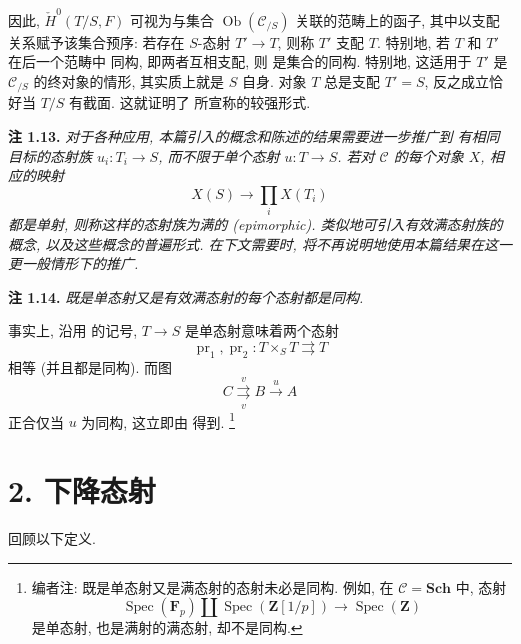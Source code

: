 因此, \(\check H^{0}(T/S,F)\) 可视为与集合
\(\operatorname{Ob}(\mathscr C_{/S})\) 关联的范畴上的函子,
其中以支配关系赋予该集合预序: 若存在 \(S\)-态射 \(T'\to T\),
则称 \(T'\) 支配 \(T\). 特别地, 若 \(T\) 和 \(T'\) 在后一个范畴中
同构, 即两者互相支配, 则
 是集合的同构.
特别地, 这适用于 \(T'\) 是 \(\mathscr C_{/S}\) 的终对象的情形,
其实质上就是 \(S\) 自身. 对象 \(T\) 总是支配 \(T'=S\),
反之成立恰好当 \(T/S\) 有截面. 这就证明了
 所宣称的较强形式.

\medskip
\noindent{}\textbf{注 1.13.}
\textit{对于各种应用, 本篇引入的概念和陈述的结果需要进一步推广到
有相同目标的态射族 \(u_i:T_i\to S\), 而不限于单个态射
\(u:T\to S\). 若对 \(\mathscr C\) 的每个对象 \(X\), 相应的映射}
\[
  X(S)\longrightarrow\prod_i X(T_i)
\]
\textit{都是单射, 则称这样的态射族为\emph{满的 (epimorphic)}.
类似地可引入有效满态射族的概念, 以及这些概念的普遍形式.
在下文需要时, 将不再说明地使用本篇结果在这一更一般情形下的推广.}

\medskip
\noindent{}\textbf{注 1.14.}
\textit{既是单态射又是有效满态射的每个态射都是同构.}

事实上, 沿用  的记号,
\(T\to S\) 是单态射意味着两个态射
\[
  \operatorname{pr}_1,\operatorname{pr}_2:T\times_ST
  \rightrightarrows T
\]
相等 (并且都是同构). 而图
\[
  C\overset{v}{\underset{v}{\rightrightarrows}}B\xrightarrow{u}A
\]
正合仅当 \(u\) 为同构, 这立即由
 得到.
\footnote{编者注: 既是单态射又是满态射的态射未必是同构.
例如, 在 \(\mathscr C=\mathbf{Sch}\) 中, 态射
\[
  \operatorname{Spec}(\mathbf F_p)\amalg
  \operatorname{Spec}(\mathbf Z[1/p])
  \longrightarrow\operatorname{Spec}(\mathbf Z)
\]
是单态射, 也是满射的满态射, 却不是同构.}

\section*{2. 下降态射}

回顾以下定义.

